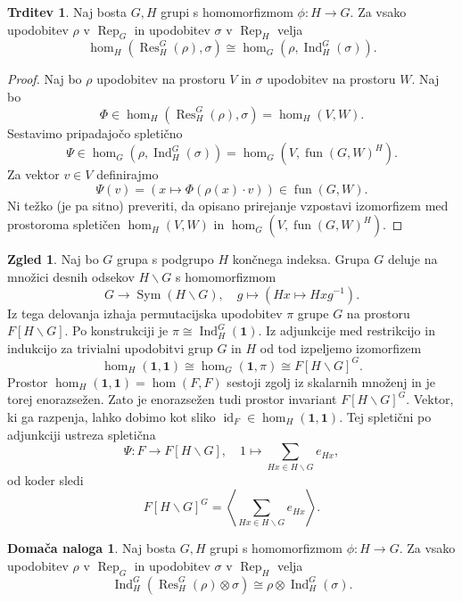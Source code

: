 \documentclass[11pt]{book}
\def\11{\mathbf{1}}
\DeclareMathOperator\Res{Res}
\DeclareMathOperator\Ind{Ind}
\DeclareMathOperator\Rep{Rep}
\DeclareMathOperator\fun{fun}
\DeclareMathOperator\Sym{Sym}
\DeclareMathOperator\id{id}
\theoremstyle{definition}
\theoremstyle{zgled}
\newtheorem*{zgled}{Zgled}
\theoremstyle{odprtproblem}
\theoremstyle{domacanaloga}
\newtheorem*{domacanaloga}{Domača naloga}
\newenvironment{dokaz}
    {\color{siva}\begin{proof}}
    {\end{proof}}
\theoremstyle{izrek}
\newtheorem*{trditev}{Trditev}
\begin{document}
\begin{trditev}
    Naj bosta $G,H$ grupi s homomorfizmom $\phi \colon H \to G$. Za vsako upodobitev $\rho$ v $\Rep_G$ in upodobitev $\sigma$ v $\Rep_H$ velja
    \[
        \textstyle \hom_H(\Res^G_H(\rho), \sigma) \cong 
        \hom_G(\rho, \Ind^G_H(\sigma)).
    \]
\end{trditev}
\begin{dokaz}
Naj bo $\rho$ upodobitev na prostoru $V$ in $\sigma$ upodobitev na prostoru $W$. Naj bo
\[
    \Phi \in \hom_H(\Res^G_H(\rho), \sigma) = \hom_H(V, W).
\]
Sestavimo pripadajočo spletično
\[
    \Psi \in \hom_G(\rho, \Ind^G_H(\sigma)) = \hom_G(V, \fun(G,W)^H).
    \]
Za vektor $v \in V$ definirajmo
\[
    \Psi(v) = \left( x \mapsto \Phi(\rho(x) \cdot v) \right) \in \fun(G,W).
\]
Ni težko (je pa sitno) preveriti, da opisano prirejanje vzpostavi izomorfizem med prostoroma spletičen $\hom_H(V,W)$ in $\hom_G(V,\fun(G,W)^H)$.
\end{dokaz}

\begin{zgled}
Naj bo $G$ grupa s podgrupo $H$ končnega indeksa. Grupa $G$ deluje na množici desnih odsekov $H \backslash G$ s homomorfizmom
\[
    G \to \Sym(H \backslash G), \quad
    g \mapsto \left( Hx \mapsto Hxg^{-1} \right).
\]
Iz tega delovanja izhaja permutacijska upodobitev $\pi$ grupe $G$ na prostoru $F[H \backslash G]$. Po konstrukciji je $\pi \cong \Ind^G_H(\11)$. Iz adjunkcije med restrikcijo in indukcijo za trivialni upodobitvi grup $G$ in $H$ od tod izpeljemo izomorfizem
\[
    \hom_H(\11, \11) \cong \hom_G(\11, \pi) \cong F[H \backslash G]^G.
\]
Prostor $\hom_H(\11, \11) = \hom(F,F)$ sestoji zgolj iz skalarnih množenj in je torej enorazsežen. Zato je enorazsežen tudi prostor invariant $F[H \backslash G]^G$. Vektor, ki ga razpenja, lahko dobimo kot sliko $\id_F \in \hom_H(\11, \11)$. Tej spletični po adjunkciji ustreza spletična
\[
    \Psi \colon F \to F[H \backslash G], \quad
    1 \mapsto \sum_{Hx \in H \backslash G} e_{Hx},
\] 
od koder sledi
\[
    F[H \backslash G]^G = \left\langle \sum_{Hx \in H \backslash G} e_{Hx} \right\rangle.
\]
\end{zgled}

\begin{domacanaloga}
    Naj bosta $G,H$ grupi s homomorfizmom $\phi \colon H \to G$. Za vsako upodobitev $\rho$ v $\Rep_G$ in upodobitev $\sigma$ v $\Rep_H$ velja
    \[
        \textstyle \Ind^G_H(\Res^G_H(\rho) \otimes \sigma) \cong
        \rho \otimes \Ind^G_H(\sigma).
    \]
\end{domacanaloga}
\end{document}
